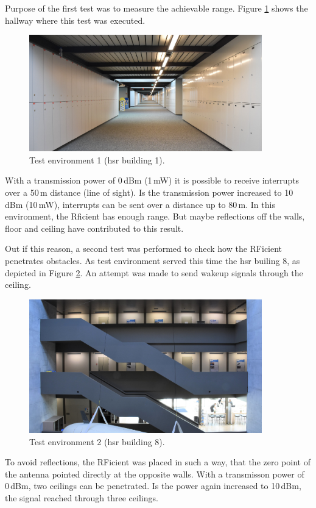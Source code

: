 Purpose of the first test was to measure the achievable range.
Figure \ref{development:env1} shows the hallway where this test was executed.
\begin{figure}[ht]
	\centering
	\includegraphics[width=0.9\textwidth]{4-development/hardware/graphics/env/env1_c.pdf}
	\caption{Test environment 1 (\acs{hsr} building 1).\label{development:env1}}
\end{figure}
With a transmission power of 0\,dBm (1\,mW) it is possible to receive interrupts over a 50\,m distance (line of sight).
Is the transmission power increased to 10\,dBm (10\,mW), interrupts can be sent over a distance up to 80\,m.
In this environment, the Rficient has enough range.
But maybe reflections off the walls, floor and ceiling have contributed to this result.

Out if this reason, a second test was performed to check how the RFicient penetrates obstacles.
As test environment served this time the \acs{hsr} builing 8, as depicted in Figure \ref{development:env2}.
An attempt was made to send wakeup signals through the ceiling.
\begin{figure}[ht]
	\centering
	\includegraphics[width=0.9\textwidth]{4-development/hardware/graphics/env/env2_c.pdf}
	\caption{Test environment 2 (\acs{hsr} building 8).\label{development:env2}}
\end{figure}
To avoid reflections, the RFicient was placed in such a way, that the zero point of the antenna pointed directly at the opposite walls.
With a transmisson power of 0\,dBm, two ceilings can be penetrated.
Is the power again increased to 10\,dBm, the signal reached through three ceilings.

